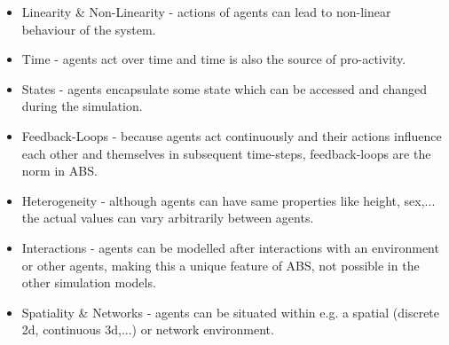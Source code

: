 \begin{itemize}
	\item Linearity \& Non-Linearity - actions of agents can lead to non-linear behaviour of the system.
	\item Time - agents act over time and time is also the source of pro-activity.
	\item States - agents encapsulate some state which can be accessed and changed during the simulation.
	\item Feedback-Loops - because agents act continuously and their actions influence each other and themselves in subsequent time-steps, feedback-loops are the norm in ABS. 
	\item Heterogeneity - although agents can have same properties like height, sex,... the actual values can vary arbitrarily between agents.
	\item Interactions - agents can be modelled after interactions with an environment or other agents, making this a unique feature of ABS, not possible in the other simulation models.
	\item Spatiality \& Networks - agents can be situated within e.g. a spatial (discrete 2d, continuous 3d,...) or network environment. %
\end{itemize}
%
%
